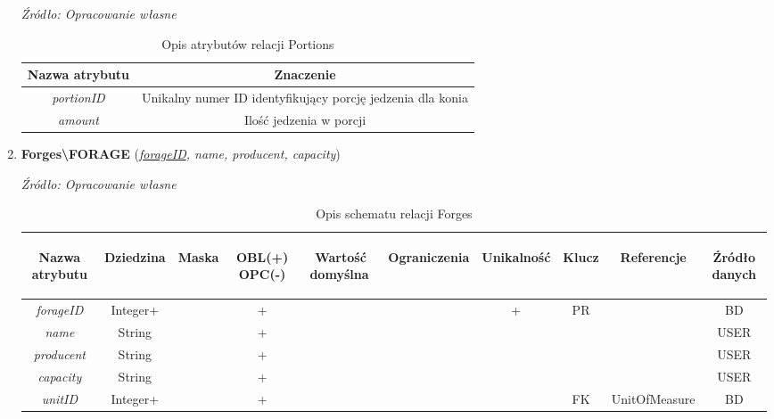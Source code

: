 \documentclass[12pt,twoside]{report}
\begin{document}
\begin{enumerate}[start=1,label={\bfseries REL\textbackslash0\arabic*}]
\begin{table}[H]
	\caption{Opis atrybutów relacji Portions}
	\textit{Źródło: Opracowanie własne}
	\label{PortionsAttributeDescription}
	\centering
	\begin{tabular}{|c|c|}
		\hline
		Nazwa atrybutu & Znaczenie \\
				\hline
		\textit{portionID}& Unikalny numer ID identyfikujący porcję jedzenia dla konia \\		
		\hline
		\textit{amount}& Ilość jedzenia w porcji\\
		\hline
	\end{tabular}
\end{table}
\item \textbf{Forges\textbackslash FORAGE} (\textit{\underline{forageID}, name, producent, capacity})
\begin{table}[H]
	\caption{Opis schematu relacji Forges}
	\textit{Źródło: Opracowanie własne}
	\label{ForgesRelationSchema}
	\centering
	\begin{tabular}{|c|c|c|c|c|c|c|c|c|c|}
		\hline
		\begin{sideways}Nazwa atrybutu\end{sideways}& 
		\begin{sideways}Dziedzina \end{sideways}& 
		\begin{sideways}Maska \end{sideways}& 
		\begin{sideways}OBL(+) OPC(-)\end{sideways} & 
		\begin{sideways}Wartość domyślna$\ $\end{sideways}& 
		\begin{sideways}Ograniczenia\end{sideways} &
		\begin{sideways}Unikalność \end{sideways}& 
		\begin{sideways}Klucz \end{sideways}& 
		\begin{sideways}Referencje \end{sideways}&
		\begin{sideways}Źródło danych\end{sideways}\\
		\hline
		\textit{forageID}&Integer+&&+&&&+&PR&&BD\\		
		\hline		
		\textit{name}&String&&+&&&&&&USER\\		
		\hline
		\textit{producent}&String&&+&&&&&&USER\\		
		\hline		
		\textit{capacity}&String&&+&&&&&&USER\\		
		\hline
		\textit{unitID}&Integer+&&+&&&&FK&UnitOfMeasure&BD\\
		\hline
	\end{tabular}
\end{table}


\end{enumerate}
\end{document}
